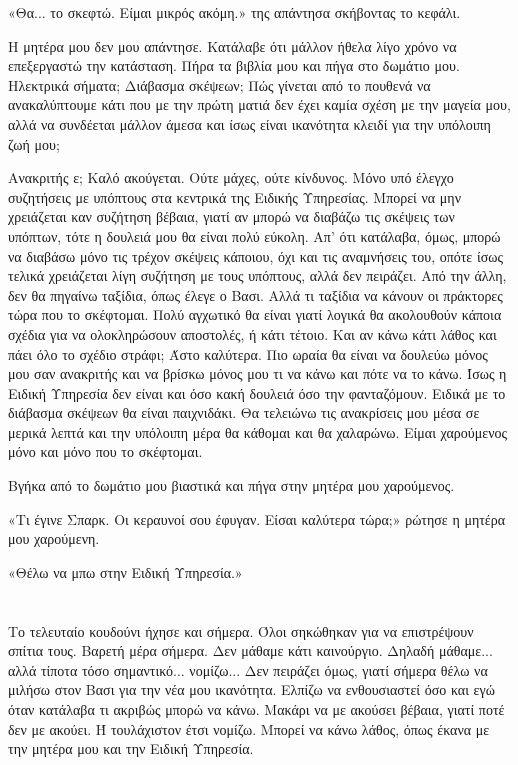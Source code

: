 \documentclass[12pt,twoside, openany]{book}
\begin{document}
«Θα... το σκεφτώ. Είμαι μικρός ακόμη.» της απάντησα σκήβοντας το κεφάλι.

Η μητέρα μου δεν μου απάντησε. Κατάλαβε ότι μάλλον ήθελα λίγο χρόνο να επεξεργαστώ την κατάσταση. Πήρα τα βιβλία μου και πήγα στο δωμάτιο μου. Ηλεκτρικά σήματα; Διάβασμα σκέψεων; Πώς γίνεται από το πουθενά να ανακαλύπτουμε κάτι που με την πρώτη ματιά δεν έχει καμία σχέση με την μαγεία μου, αλλά να συνδέεται μάλλον άμεσα και ίσως είναι ικανότητα κλειδί για την υπόλοιπη ζωή μου;

Ανακριτής ε; Καλό ακούγεται. Ούτε μάχες, ούτε κίνδυνος. Μόνο υπό έλεγχο συζητήσεις με υπόπτους στα κεντρικά της Ειδικής Υπηρεσίας. Μπορεί να μην χρειάζεται καν συζήτηση βέβαια, γιατί αν μπορώ να διαβάζω τις σκέψεις των υπόπτων, τότε η δουλειά μου θα είναι πολύ εύκολη. Απ’ ότι κατάλαβα, όμως, μπορώ να διαβάσω μόνο τις τρέχον σκέψεις κάποιου, όχι και τις αναμνήσεις του, οπότε ίσως τελικά χρειάζεται λίγη συζήτηση με τους υπόπτους, αλλά δεν πειράζει. Από την άλλη, δεν θα πηγαίνω ταξίδια, όπως έλεγε ο Βασι. Αλλά τι ταξίδια να κάνουν οι πράκτορες τώρα που το σκέφτομαι. Πολύ αγχωτικό θα είναι γιατί λογικά θα ακολουθούν κάποια σχέδια για να ολοκληρώσουν αποστολές, ή κάτι τέτοιο. Και αν κάνω κάτι λάθος και πάει όλο το σχέδιο στράφι; Άστο καλύτερα. Πιο ωραία θα είναι να δουλεύω μόνος μου σαν ανακριτής και να βρίσκω μόνος μου τι να κάνω και πότε να το κάνω. Ίσως η Ειδική Υπηρεσία δεν είναι και όσο κακή δουλειά όσο την φανταζόμουν. Ειδικά με το διάβασμα σκέψεων θα είναι παιχνιδάκι. Θα τελειώνω τις ανακρίσεις μου μέσα σε μερικά λεπτά και την υπόλοιπη μέρα θα κάθομαι και θα χαλαρώνω. Είμαι χαρούμενος μόνο και μόνο που το σκέφτομαι.

Βγήκα από το δωμάτιο μου βιαστικά και πήγα στην μητέρα μου χαρούμενος.

«Τι έγινε Σπαρκ. Οι κεραυνοί σου έφυγαν. Είσαι καλύτερα τώρα;» ρώτησε η μητέρα μου χαρούμενη.

«Θέλω να μπω στην Ειδική Υπηρεσία.»

\chapter{}

Το τελευταίο κουδούνι ήχησε και σήμερα. Όλοι σηκώθηκαν για να επιστρέψουν σπίτια τους. Βαρετή μέρα σήμερα. Δεν μάθαμε κάτι καινούργιο. Δηλαδή μάθαμε... αλλά τίποτα τόσο σημαντικό... νομίζω... Δεν πειράζει όμως, γιατί σήμερα θέλω να μιλήσω στον Βασι για την νέα μου ικανότητα. Ελπίζω να ενθουσιαστεί όσο και εγώ όταν κατάλαβα τι ακριβώς μπορώ να κάνω. Μακάρι να με ακούσει βέβαια, γιατί ποτέ δεν με ακούει. Ή τουλάχιστον έτσι νομίζω. Μπορεί να κάνω λάθος, όπως έκανα με την μητέρα μου και την Ειδική Υπηρεσία.
\end{document}
